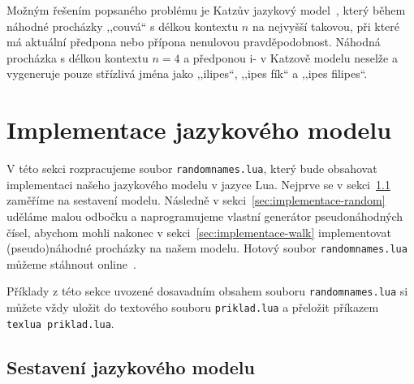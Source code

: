 \documentclass{csbulletin}
\newcommand\vref[1]{\ref{#1} na straně~\pageref{#1}}
\let\vref=\ref
\begin{document}
Možným řešením popsaného problému je Katzův jazykový model~\cite{katz1987estimation}, který během náhodné procházky ,,couvá`` s délkou kontextu $n$ na nejvyšší takovou, při které má aktuální předpona nebo přípona nenulovou pravděpodobnost. Náhodná procházka s délkou kontextu $n=4$ a předponou i- v Katzově modelu neselže a vygeneruje pouze střízlivá jména jako ,,ilipes``, ,,ipes fík`` a ,,ipes filipes``.

\section{Implementace jazykového modelu}
\label{sec:implementace}

V této sekci rozpracujeme soubor \texttt{randomnames.lua}, který bude obsahovat implementaci našeho jazykového modelu v jazyce Lua. Nejprve se v sekci~\ref{sec:implementace-model} zaměříme na sestavení modelu. Následně v sekci~\vref{sec:implementace-random} uděláme malou odbočku a naprogramujeme vlastní generátor pseudonáhodných čísel, abychom mohli nakonec v sekci~\vref{sec:implementace-walk} implementovat (pseudo)náhodné procházky na našem modelu. Hotový soubor \texttt{randomnames.lua} můžeme stáhnout online~\cite{novotny2023napadovnik}.

Příklady z této sekce uvozené dosavadním obsahem souboru \texttt{randomnames.lua} si můžete vždy uložit do textového souboru \texttt{priklad.lua} a přeložit příkazem \texttt{texlua priklad.lua}.

\subsection{Sestavení jazykového modelu}
\label{sec:implementace-model}
\end{document}
